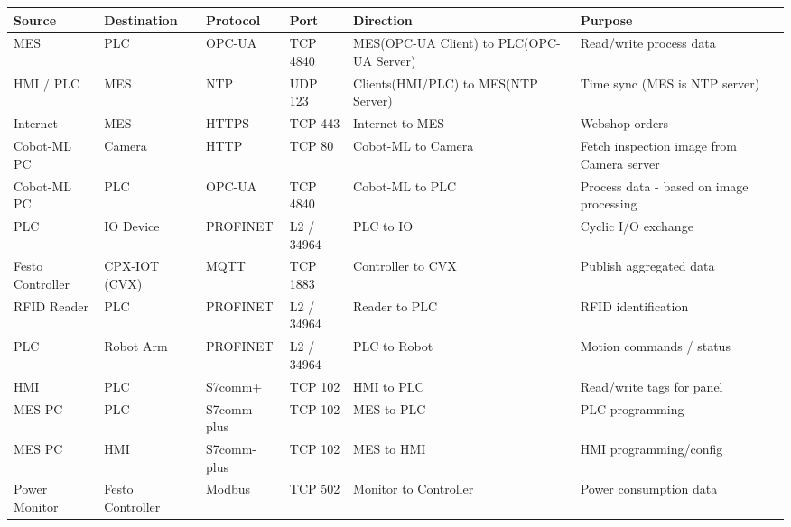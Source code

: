 \documentclass{report}
\begin{document}
{\small
\setlength{\tabcolsep}{4pt}
\begin{longtable}{L{2.6cm} L{2.0cm} L{1.8cm} L{1.8cm} L{3.4cm} L{3.2cm}}
\toprule
\textbf{Source} & \textbf{Destination} & \textbf{Protocol} & \textbf{Port} & \textbf{Direction} & \textbf{Purpose} \\
\midrule \endhead
    MES & PLC & OPC-UA & TCP 4840 & MES(OPC-UA Client) to
    PLC(OPC-UA Server) & Read/write process data \\ 

    HMI / PLC & MES & NTP & UDP 123 &
    Clients(HMI/PLC) to MES(NTP Server) & Time sync (MES is NTP server) \\

    Internet & MES & HTTPS & TCP 443 & Internet to MES &
    Webshop orders \\ 

    Cobot-ML PC & Camera & HTTP & TCP 80 & Cobot-ML to
    Camera & Fetch inspection image from Camera server \\ 

    Cobot-ML PC & PLC & OPC-UA & TCP 4840 & Cobot-ML to PLC & 
    Process data - based on image processing \\

    PLC & IO Device & PROFINET &
    L2 / 34964 & PLC to IO & Cyclic I/O exchange \\ 

    Festo Controller & CPX-IOT (CVX) & MQTT & TCP 1883 &
    Controller to CVX & Publish aggregated data \\ 

    RFID Reader & PLC & PROFINET & L2 / 34964 & Reader to PLC &
    RFID identification \\ 

    PLC & Robot Arm & PROFINET & L2 /
    34964 & PLC to Robot & Motion commands / status \\ 

    HMI & PLC & S7comm+ & TCP 102 & HMI to PLC & Read/write
    tags for panel \\ 

    MES PC & PLC & S7comm-plus & TCP 102 & MES to PLC & PLC programming \\ 

    MES PC & HMI & S7comm-plus & TCP 102 & MES to HMI & HMI
    programming/config \\ 

    Power Monitor & Festo Controller & Modbus & TCP 502
    & Monitor to Controller & Power consumption data \\
\bottomrule
\end{longtable}
}
\end{document}
